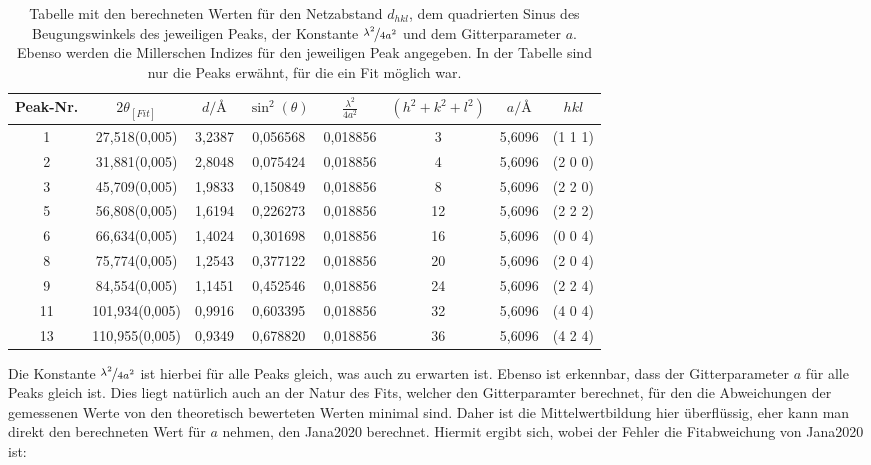 \begin{table}[h!]
    \centering
     \begin{tabular}{|c|c|c|c|c|c|c|c|} 
     \hline
     Peak-Nr. & $2\theta_{[Fit]}$ & $d/\si{\angstrom}$ & $\sin^2(\theta)$ & $\frac{\lambda^2}{4a^2}$ & $(h^2+k^2+l^2)$ & $a/\si{\angstrom}$ &  $h k l $ \\ [0.5ex] 
     \hline\hline
     1 & \num{27,518(0,005)} & 3,2387 & 0,056568 & 0,018856 & 3 & 5,6096 & (1 1 1) \\
     2 & \num{31,881(0,005)} & 2,8048 & 0,075424 & 0,018856 & 4 & 5,6096 & (2 0 0) \\
     3 & \num{45,709(0,005)} & 1,9833 & 0,150849 & 0,018856 & 8 & 5,6096 & (2 2 0) \\
     5 & \num{56,808(0,005)} & 1,6194 & 0,226273 & 0,018856 & 12 & 5,6096 & (2 2 2) \\ 
     6 & \num{66,634(0,005)} & 1,4024 & 0,301698 & 0,018856 & 16 &  5,6096 & (0 0 4)\\
     8 & \num{75,774(0,005)} & 1,2543 & 0,377122 & 0,018856 & 20 &  5,6096 & (2 0 4)\\
     9 & \num{84,554(0,005)} & 1,1451  &  0,452546 & 0,018856 & 24 &  5,6096 & (2 2 4)\\
     11 & \num{101,934(0,005)} & 0,9916 & 0,603395 & 0,018856 & 32 &  5,6096 & (4 0 4)\\
     13 & \num{110,955(0,005)} & 0,9349 & 0,678820 & 0,018856 & 36 &  5,6096 & (4 2 4)\\ [1ex] 
     \hline
     \end{tabular}
     \caption[short]{Tabelle mit den berechneten Werten für den Netzabstand $d_{hkl}$, dem quadrierten Sinus des Beugungswinkels des jeweiligen Peaks, der Konstante $\nicefrac[]{\lambda^2}{4a^2}$ und dem Gitterparameter $a$. Ebenso werden die Millerschen Indizes für den jeweiligen Peak angegeben. In der Tabelle sind nur die Peaks erwähnt, für die ein Fit möglich war.}
     \label{tab:gitter}
\end{table}

Die Konstante $\nicefrac[]{\lambda^2}{4a^2}$ ist hierbei für alle Peaks gleich, was auch zu erwarten ist.
Ebenso ist erkennbar, dass der Gitterparameter $a$ für alle Peaks gleich ist. Dies liegt natürlich auch an der Natur des Fits, welcher den Gitterparamter berechnet, für den die Abweichungen der gemessenen Werte von den theoretisch bewerteten Werten minimal sind. Daher ist die Mittelwertbildung hier überflüssig, eher kann man direkt den berechneten Wert für $a$ nehmen, den Jana2020 berechnet. Hiermit ergibt sich, wobei der Fehler die Fitabweichung von Jana2020 ist:

